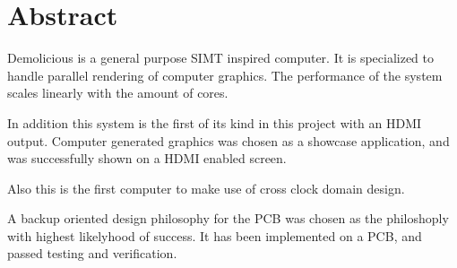 \documentclass[../main/report.tex]{subfiles}
\begin{document}
\chapter*{Abstract}
\label{sec:abstract}

\vspace*{\fill}

Demolicious is a general purpose SIMT inspired computer.
It is specialized to handle parallel rendering of computer graphics.
The performance of the system scales linearly with the amount of cores.

In addition this system is the first of its kind in this project with an HDMI output.
Computer generated graphics was chosen as a showcase application, and was successfully shown on a HDMI enabled screen.

Also this is the first computer to make use of cross clock domain design.

A backup oriented design philosophy for the PCB was chosen as the philoshoply with highest likelyhood of success.
It has been implemented on a PCB, and passed testing and verification.

\vspace*{\fill}
\end{document}
